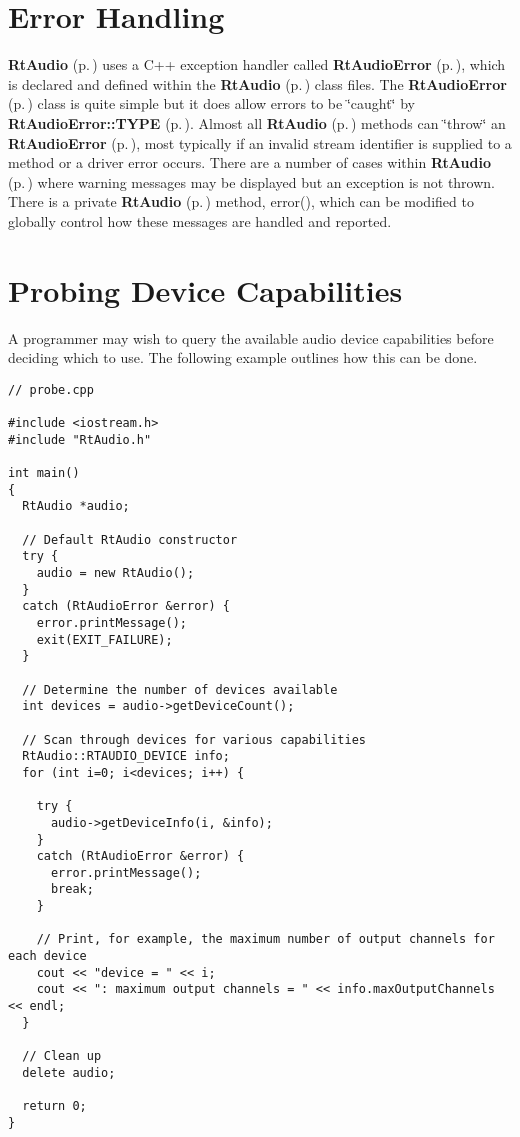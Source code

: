 \section{Error Handling}\label{error}


{\bf Rt\-Audio} {\rm (p.\,\pageref{classRtAudio})} uses a C++ exception handler called {\bf Rt\-Audio\-Error} {\rm (p.\,\pageref{classRtAudioError})}, which is declared and defined within the {\bf Rt\-Audio} {\rm (p.\,\pageref{classRtAudio})} class files. The {\bf Rt\-Audio\-Error} {\rm (p.\,\pageref{classRtAudioError})} class is quite simple but it does allow errors to be \char`\"{}caught\char`\"{} by {\bf Rt\-Audio\-Error::TYPE} {\rm (p.\,\pageref{classRtAudioError_s11})}. Almost all {\bf Rt\-Audio} {\rm (p.\,\pageref{classRtAudio})} methods can \char`\"{}throw\char`\"{} an {\bf Rt\-Audio\-Error} {\rm (p.\,\pageref{classRtAudioError})}, most typically if an invalid stream identifier is supplied to a method or a driver error occurs. There are a number of cases within {\bf Rt\-Audio} {\rm (p.\,\pageref{classRtAudio})} where warning messages may be displayed but an exception is not thrown. There is a private {\bf Rt\-Audio} {\rm (p.\,\pageref{classRtAudio})} method, error(), which can be modified to globally control how these messages are handled and reported.

\section{Probing Device Capabilities}\label{probing}


A programmer may wish to query the available audio device capabilities before deciding which to use. The following example outlines how this can be done.

\footnotesize\begin{verbatim}// probe.cpp

#include <iostream.h>
#include "RtAudio.h"

int main()
{
  RtAudio *audio;

  // Default RtAudio constructor
  try {
    audio = new RtAudio();
  }
  catch (RtAudioError &error) {
    error.printMessage();
    exit(EXIT_FAILURE);
  }

  // Determine the number of devices available
  int devices = audio->getDeviceCount();

  // Scan through devices for various capabilities
  RtAudio::RTAUDIO_DEVICE info;
  for (int i=0; i<devices; i++) {

    try {
      audio->getDeviceInfo(i, &info);
    }
    catch (RtAudioError &error) {
      error.printMessage();
      break;
    }

    // Print, for example, the maximum number of output channels for each device
    cout << "device = " << i;
    cout << ": maximum output channels = " << info.maxOutputChannels << endl;
  }

  // Clean up
  delete audio;

  return 0;
}\end{verbatim}\normalsize 


